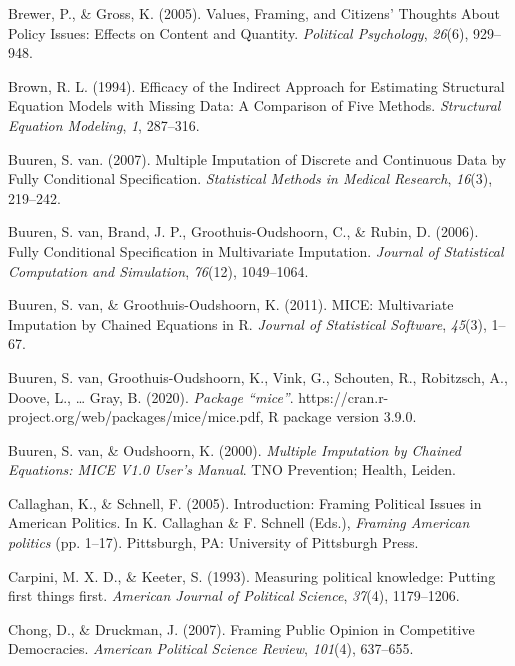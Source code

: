 \documentclass[12pt,econ]{sources/authesis}
\begin{document}
\leavevmode\hypertarget{ref-brewer_values_2005}{}%
Brewer, P., \& Gross, K. (2005). Values, Framing, and Citizens' Thoughts About Policy Issues: Effects on Content and Quantity. \emph{Political Psychology}, \emph{26}(6), 929--948.

\leavevmode\hypertarget{ref-brown_1994_efficacy}{}%
Brown, R. L. (1994). Efficacy of the Indirect Approach for Estimating Structural Equation Models with Missing Data: A Comparison of Five Methods. \emph{Structural Equation Modeling}, \emph{1}, 287--316.

\leavevmode\hypertarget{ref-buuren_2007_multiple}{}%
Buuren, S. van. (2007). Multiple Imputation of Discrete and Continuous Data by Fully Conditional Specification. \emph{Statistical Methods in Medical Research}, \emph{16}(3), 219--242.

\leavevmode\hypertarget{ref-buuren_2006_fully}{}%
Buuren, S. van, Brand, J. P., Groothuis-Oudshoorn, C., \& Rubin, D. (2006). Fully Conditional Specification in Multivariate Imputation. \emph{Journal of Statistical Computation and Simulation}, \emph{76}(12), 1049--1064.

\leavevmode\hypertarget{ref-buuren_2011_mice}{}%
Buuren, S. van, \& Groothuis-Oudshoorn, K. (2011). MICE: Multivariate Imputation by Chained Equations in R. \emph{Journal of Statistical Software}, \emph{45}(3), 1--67.

\leavevmode\hypertarget{ref-buuren_2020_package}{}%
Buuren, S. van, Groothuis-Oudshoorn, K., Vink, G., Schouten, R., Robitzsch, A., Doove, L., \ldots{} Gray, B. (2020). \emph{Package ``mice''}. https://cran.r-project.org/web/packages/mice/mice.pdf, R package version 3.9.0.

\leavevmode\hypertarget{ref-buuren_2000_multiple}{}%
Buuren, S. van, \& Oudshoorn, K. (2000). \emph{Multiple Imputation by Chained Equations: MICE V1.0 User's Manual}. TNO Prevention; Health, Leiden.

\leavevmode\hypertarget{ref-callaghan_introduction_2005}{}%
Callaghan, K., \& Schnell, F. (2005). Introduction: Framing Political Issues in American Politics. In K. Callaghan \& F. Schnell (Eds.), \emph{Framing American politics} (pp. 1--17). Pittsburgh, PA: University of Pittsburgh Press.

\leavevmode\hypertarget{ref-carpini_1993_measuring}{}%
Carpini, M. X. D., \& Keeter, S. (1993). Measuring political knowledge: Putting first things first. \emph{American Journal of Political Science}, \emph{37}(4), 1179--1206.

\leavevmode\hypertarget{ref-chong_framing_2007}{}%
Chong, D., \& Druckman, J. (2007). Framing Public Opinion in Competitive Democracies. \emph{American Political Science Review}, \emph{101}(4), 637--655.
\end{document}
